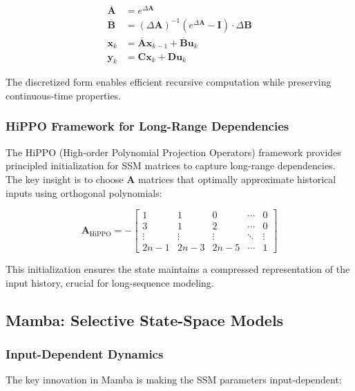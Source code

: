 \documentclass[10pt,journal,compsoc]{IEEEtran}
\begin{document}
\begin{align}
\overline{\mathbf{A}} &= e^{\Delta \mathbf{A}} \\
\overline{\mathbf{B}} &= (\Delta \mathbf{A})^{-1}(e^{\Delta \mathbf{A}} - \mathbf{I}) \cdot \Delta \mathbf{B} \\
\mathbf{x}_k &= \overline{\mathbf{A}} \mathbf{x}_{k-1} + \overline{\mathbf{B}} \mathbf{u}_k \\
\mathbf{y}_k &= \mathbf{C} \mathbf{x}_k + \mathbf{D} \mathbf{u}_k
\end{align}

The discretized form enables efficient recursive computation while preserving continuous-time properties.

\subsubsection{HiPPO Framework for Long-Range Dependencies}

The HiPPO (High-order Polynomial Projection Operators) framework \cite{gu2020hippo} provides principled initialization for SSM matrices to capture long-range dependencies. The key insight is to choose $\mathbf{A}$ matrices that optimally approximate historical inputs using orthogonal polynomials:

\begin{equation}
\mathbf{A}_{\text{HiPPO}} = -\begin{bmatrix}
1 & 1 & 0 & \cdots & 0 \\
3 & 1 & 2 & \cdots & 0 \\
\vdots & \vdots & \vdots & \ddots & \vdots \\
2n-1 & 2n-3 & 2n-5 & \cdots & 1
\end{bmatrix}
\end{equation}

This initialization ensures the state maintains a compressed representation of the input history, crucial for long-sequence modeling.

\subsection{Mamba: Selective State-Space Models}

\subsubsection{Input-Dependent Dynamics}

The key innovation in Mamba is making the SSM parameters input-dependent:
\end{document}
